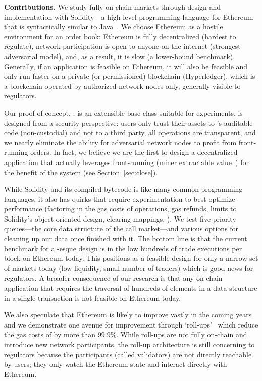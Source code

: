 \textbf{Contributions.} We study fully on-chain markets through design and implementation with Solidity---a high-level programming language for Ethereum that is syntactically similar to Java~\cite{Ethereum41:online}. We choose Ethereum as a hostile environment for an order book: Ethereum is fully decentralized (hardest to regulate), network participation is open to anyone on the internet (strongest adversarial model), and, as a result, it is slow (a lower-bound benchmark). Generally, if an application is feasible on Ethereum, it will also be feasible and only run faster on a private (or permissioned) blockchain (\eg Hyperledger), which is a blockchain operated by authorized network nodes only, generally visible to regulators. 

Our proof-of-concept, \cm, is an extensible base class suitable for experiments. \cm is designed from a security perspective: users only trust their assets to \cm's auditable code (non-custodial) and not to a third party, all operations are transparent, and we nearly eliminate the ability for adversarial network nodes to profit from front-running orders. In fact, we believe we are the first to design a decentralized application that actually leverages front-running (\ie miner extractable value~\cite{daian2019flash}) for the benefit of the system (see Section~\ref{sec:close}).  

While Solidity and its compiled bytecode is like many common programming languages, it also has quirks that require experimentation to best optimize performance (\eg factoring in the gas costs of operations, gas refunds, limits to Solidity's object-oriented design, clearing mappings, \etc). We test five priority queues---the core data structure of the call market---and various options for cleaning up our data once finished with it. The bottom line is that the current benchmark for a \cm-esque design is in the low hundreds of trade executions per block on Ethereum today. This positions \cm as a feasible design for only a narrow set of markets today (low liquidity, small number of traders) which is good news for regulators. A broader consequence of our research is that any on-chain application that requires the traversal of hundreds of elements in a data structure in a single transaction is not feasible on Ethereum today. 

We also speculate that Ethereum is likely to improve vastly in the coming years and we demonstrate one avenue for improvement through `roll-ups'~\cite{kalodner2018arbitrum} which reduce the gas costs of \cm by more than 99.9\%. While roll-ups are not fully on-chain and introduce new network participants, the roll-up architecture is still concerning to regulators because the participants (called validators) are not directly reachable by users; they only watch the Ethereum state and interact directly with Ethereum.  

